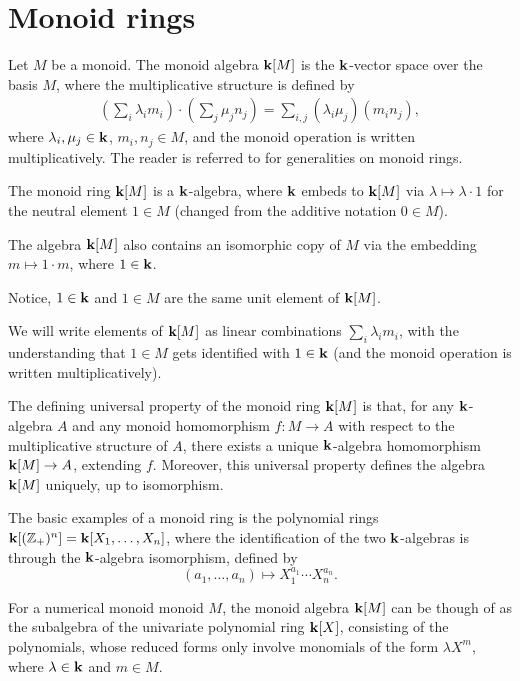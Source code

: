 \section{Monoid rings}

Let $M$ be a monoid. The monoid algebra $\mathbf{k}[M]$ is the $\mathbf{k}$-vector space over the basis $M$, where the multiplicative structure is defined by
\begin{align*}
\left(\sum_i\lambda_im_i\right)
\cdot\left(\sum_j\mu_jn_j\right)=\sum_{i,j}(\lambda_i\mu_j)(m_in_j),
\end{align*} 
where $\lambda_i,\mu_j\in\mathbf{k}$, $m_i,n_j\in M$, and the monoid operation is written multiplicatively. The reader is referred to \cite[Chapter 2]{Kripo} for generalities on monoid rings. 

The monoid ring $\mathbf{k}[M]$ is a $\mathbf{k}$-algebra, where $\mathbf{k}$ embeds to $\mathbf{k}[M]$ via $\lambda\mapsto\lambda\cdot 1$ for the neutral element $1\in M$ (changed from the additive notation $0\in M$). 

The algebra $\mathbf{k}[M]$ also contains an isomorphic copy of $M$ via the embedding $m\mapsto 1\cdot m$, where $1\in\mathbf{k}$.

Notice, $1\in\mathbf{k}$ and $1\in M$ are the same unit element of $\mathbf{k}[M]$.

We will write elements of $\mathbf{k}[M]$ as linear combinations $\sum_i\lambda_im_i$, with the understanding that $1\in M$ gets identified with $1\in\mathbf{k}$ (and the monoid operation is written multiplicatively).

The defining universal property of the monoid ring $\mathbf{k}[M]$ is that, for any $\mathbf{k}$-algebra $A$ and any monoid homomorphism $f:M\to A$ with respect to the multiplicative structure of $A$, there exists a unique $\mathbf{k}$-algebra homomorphism $\mathbf{k}[M]\to A$, extending $f$.  Moreover, this universal property defines the algebra $\mathbf{k}[M]$ uniquely, up to isomorphism.

\begin{example}\label{polynomial_example}
The basic examples of a monoid ring is the polynomial rings $\mathbf{k}[(\mathbb Z_+)^n]=\mathbf{k}[X_1,\ldots,X_n]$, where the identification of the two $\mathbf{k}$-algebras is through the $\mathbf{k}$-algebra isomorphism, defined by 
$$
(a_1,\ldots,a_n)\mapsto X_1^{a_1}\cdots X_n^{a_n}.
$$
\end{example}

\begin{example}\label{numerical_polynomial}
For a numerical monoid monoid $M$, the monoid algebra $\mathbf{k}[M]$ can be though of as the subalgebra of the univariate polynomial ring $\mathbf{k}[X]$, consisting of the polynomials, whose reduced forms only involve monomials of the form $\lambda X^m$, where $\lambda\in\mathbf{k}$ and $m\in M$.
\end{example}

